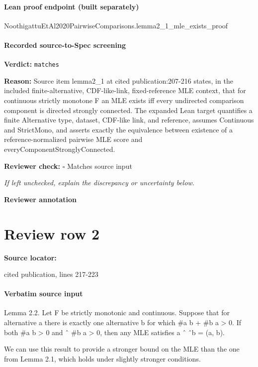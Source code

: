 \documentclass[10pt]{article}
\newcommand{\reviewerbox}{%
  \par\noindent\fbox{\parbox{0.96\linewidth}{\rule{0pt}{0.38in}}}\par
}
\newcommand{\reviewmatch}[1]{%
  \par\noindent\textbf{Reviewer check:} $\square$\; #1\par
  \noindent\emph{If left unchecked, explain the discrepancy or uncertainty below.}\par
}
\begin{document}
\paragraph{Lean proof endpoint (built separately)}\begin{ReviewVerbatim}
NoothigattuEtAl2020PairwiseComparisons.lemma2_1_mle_exists_proof
\end{ReviewVerbatim}

\paragraph{Recorded source-to-Spec screening}
\textbf{Verdict:} \texttt{matches}
\\
{\raggedright
\textbf{Reason:} Source item lemma2\_\allowbreak{}1 at cited publication:\allowbreak{}207-\allowbreak{}216 states, in the included finite-\allowbreak{}alternative, CDF-\allowbreak{}like-\allowbreak{}link, fixed-\allowbreak{}reference MLE context, that for continuous strictly monotone F an MLE exists iff every undirected comparison component is directed strongly connected.\allowbreak{} The expanded Lean target quantifies a finite Alternative type, dataset, CDF-\allowbreak{}like link, and reference, assumes Continuous and StrictMono, and asserts exactly the equivalence between existence of a reference-\allowbreak{}normalized pairwise MLE score and everyComponentStronglyConnected.\allowbreak{}
\par}
\reviewmatch{Matches source input}
\noindent\textbf{Reviewer annotation}\par
\reviewerbox
\clearpage
\hypertarget{source-claim-54fc19f0aa38d1c6}{}
\section*{Review row 2}
\textbf{Source locator:} {\footnotesize\raggedright cited publication, lines 217-\allowbreak{}223\par}
\paragraph{Verbatim source input}
\begin{ReviewVerbatim}
Lemma 2.2. Let F be strictly monotonic and continuous. Suppose that for alternative a there is
exactly one alternative b for which #{a         b} + #{b      a} > 0. If both #{a       b} > 0 and
                                  ˆ
#{b a} > 0, then any MLE satisfies a        ˆ     ˆb = (a, b).

We can use this result to provide a stronger bound on the MLE than the one from Lemma 2.1, which
holds under slightly stronger conditions.
\end{ReviewVerbatim}
\end{document}
